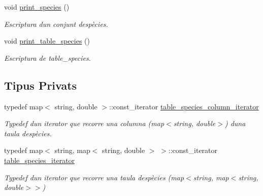 \begin{DoxyCompactItemize}
void \hyperlink{class_cjt___especies_a362d2295d52e2a4cb3618bda7ad3f65b}{print\+\_\+species} ()
\begin{DoxyCompactList}\small\item\em Escriptura d\textquotesingle{}un conjunt d\textquotesingle{}espècies. \end{DoxyCompactList}\item 
void \hyperlink{class_cjt___especies_ab6ebf81bf6ad734a970c3677fd4e5250}{print\+\_\+table\+\_\+species} ()
\begin{DoxyCompactList}\small\item\em Escriptura de table\+\_\+species. \end{DoxyCompactList}\end{DoxyCompactItemize}
\subsection*{Tipus Privats}
\begin{DoxyCompactItemize}
\item 
typedef map$<$ string, double $>$\+::const\+\_\+iterator \hyperlink{class_cjt___especies_a11316f4de57c3d78183137abe33b31c5}{table\+\_\+species\+\_\+column\+\_\+iterator}
\begin{DoxyCompactList}\small\item\em Typedef d\textquotesingle{}un iterator que recorre una columna (map$<$string, double$>$) d\textquotesingle{}una taula d\textquotesingle{}espècies. \end{DoxyCompactList}\item 
typedef map$<$ string, map$<$ string, double $>$ $>$\+::const\+\_\+iterator \hyperlink{class_cjt___especies_a5da209bb73685ff7a89041202bcdd8c7}{table\+\_\+species\+\_\+iterator}
\begin{DoxyCompactList}\small\item\em Typedef d\textquotesingle{}un iterator que recorre una taula d\textquotesingle{}espècies (map$<$string, map$<$string, double$>$$>$) \end{DoxyCompactList}\end{DoxyCompactItemize}
